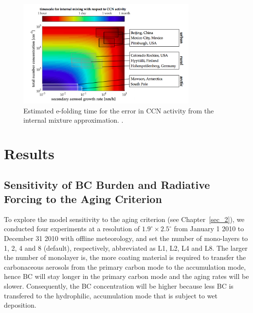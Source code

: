 \documentclass[12pt, fullpage]{uiucthesis2009}
\begin{document}
	\begin{figure}[h] 
		\begin{center}
			\includegraphics[width = 0.8\textwidth]{Figure07}
			\caption[Estimated e-folding time for the error in CCN activity from the internal mixture approximation. \citep{Fierce2016}]{\label{fig_P7}Estimated e-folding time for the error in CCN activity from the internal mixture approximation. \citep{Fierce2016}.}
		\end{center}
	\end{figure}
	
	\clearpage
	
	\chapter{Results}

	
	\section{Sensitivity of BC Burden and Radiative Forcing to the Aging Criterion}{\label{sec_1}}
	To explore the model sensitivity to the aging criterion (see Chapter~\ref{sec_2}), we conducted four experiments at a resolution of $1.9^\circ \times 2.5^\circ$ from January 1 2010 to December 31 2010 with offline meteorology, and set the number of mono-layers to 1, 2, 4 and 8 (default), respectively, abbreviated as L1, L2, L4 and L8. The larger the number of monolayer is, the more coating material is required to transfer the carbonaceous aerosols from the primary carbon mode to the accumulation mode, hence BC will stay longer in the primary carbon mode and the aging rates will be slower. Consequently, the BC concentration will be higher because less BC is transfered to the hydrophilic, accumulation mode that is subject to wet deposition. 
\end{document}
